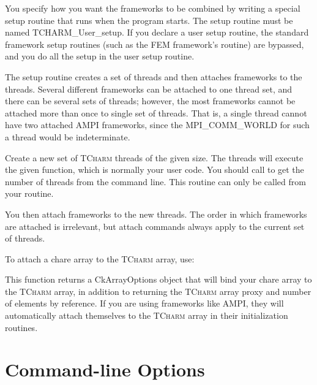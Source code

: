 \documentclass[10pt]{article}
\newcommand{\tcharm}{\textsc{TCharm}}
\begin{document}
You specify how you want the frameworks to be combined by writing
a special setup routine that runs when the program starts.
The setup routine must be named TCHARM\_User\_setup.  If you declare a 
user setup routine, the standard framework setup routines (such
as the FEM framework's  routine) are bypassed, and you
do all the setup in the user setup routine.

The setup routine creates a set of threads and then attaches frameworks
to the threads.  Several different frameworks can be attached to one thread set,
and there can be several sets of threads; however, the most frameworks
cannot be attached more than once to single set of threads. That is, a single
thread cannot have two attached AMPI frameworks, since the MPI\_COMM\_WORLD 
for such a thread would be indeterminate.

\vspace{0.2in}

Create a new set of \tcharm{} threads of the given size.  The threads will
execute the given function, which is normally your user code.  
You should call  
to get the number of threads from the command line.  This routine can 
only be called from your  routine.

You then attach frameworks to the new threads.  The order in which
frameworks are attached is irrelevant, but attach commands always apply
to the current set of threads.
  
To attach a chare array to the \tcharm{} array, use:

This function returns a CkArrayOptions object that will bind your chare array to the \tcharm{} array, in addition to returning the \tcharm{} array proxy and number of elements by reference. If you are using frameworks like AMPI, they will automatically attach themselves to the \tcharm{} array in their initialization routines.

\section{Command-line Options}
\label{sec:cla}
\end{document}
